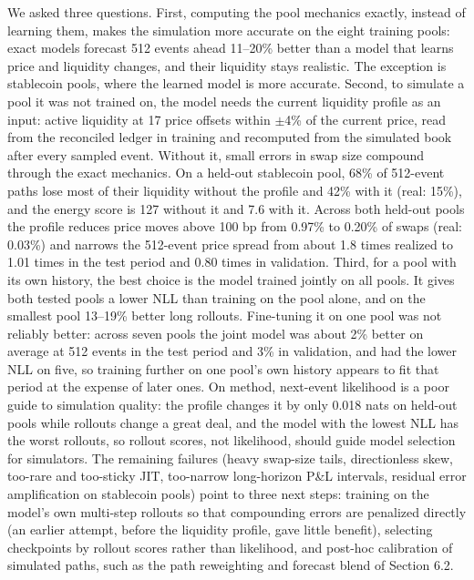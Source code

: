 \documentclass[11pt]{article}
\begin{document}
We asked three questions. First, computing the pool mechanics exactly, instead of learning them, makes the simulation more accurate on the eight training pools: exact models forecast 512 events ahead 11--20\% better than a model that learns price and liquidity changes, and their liquidity stays realistic. The exception is stablecoin pools, where the learned model is more accurate. Second, to simulate a pool it was not trained on, the model needs the current liquidity profile as an input: active liquidity at 17 price offsets within \ensuremath{\pm}4\% of the current price, read from the reconciled ledger in training and recomputed from the simulated book after every sampled event. Without it, small errors in swap size compound through the exact mechanics. On a held-out stablecoin pool, 68\% of 512-event paths lose most of their liquidity without the profile and 42\% with it (real: 15\%), and the energy score is 127 without it and 7.6 with it. Across both held-out pools the profile reduces price moves above 100 bp from 0.97\% to 0.20\% of swaps (real: 0.03\%) and narrows the 512-event price spread from about 1.8 times realized to 1.01 times in the test period and 0.80 times in validation. Third, for a pool with its own history, the best choice is the model trained jointly on all pools. It gives both tested pools a lower NLL than training on the pool alone, and on the smallest pool 13--19\% better long rollouts. Fine-tuning it on one pool was not reliably better: across seven pools the joint model was about 2\% better on average at 512 events in the test period and 3\% in validation, and had the lower NLL on five, so training further on one pool's own history appears to fit that period at the expense of later ones. On method, next-event likelihood is a poor guide to simulation quality: the profile changes it by only 0.018 nats on held-out pools while rollouts change a great deal, and the model with the lowest NLL has the worst rollouts, so rollout scores, not likelihood, should guide model selection for simulators. The remaining failures (heavy swap-size tails, directionless skew, too-rare and too-sticky JIT, too-narrow long-horizon P\&L intervals, residual error amplification on stablecoin pools) point to three next steps: training on the model's own multi-step rollouts so that compounding errors are penalized directly (an earlier attempt, before the liquidity profile, gave little benefit), selecting checkpoints by rollout scores rather than likelihood, and post-hoc calibration of simulated paths, such as the path reweighting and forecast blend of Section 6.2.
\end{document}
